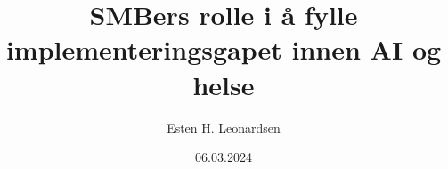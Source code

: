 \documentclass{beamer}
\title{SMBers rolle i å fylle implementeringsgapet innen AI og helse}
\author{Esten H. Leonardsen}
\date{06.03.2024}
\begin{document}
	\begin{frame}
	 	\titlepage
	\end{frame}

    \newcommand{\stickman}[2]{
        \node[circle,fill,minimum size=2.5mm,#2] (head) at #1 {};
        \node[rounded corners=1pt,minimum height=0.65cm,minimum width=0.2cm,fill,below = 0.5pt of head,#2] (body) {};
        \draw[line width=0.5mm,round cap-round cap,#2] ([shift={(1pt,-0.5pt)}]body.north east) --++(-90:3mm);
        \draw[line width=0.5mm,round cap-round cap,#2] ([shift={(-1pt,-0.5pt)}]body.north west)--++(-90:3mm);
        \draw[thick,white,-round cap] (body.south) --++(90:2.75mm);
    }


    \newcommand{\population}{
        \begin{tikzpicture}
            \node [
                double arrow,
                left color=blue,
                right color=red,
                double arrow head extend=0pt,
                transform shape,
                minimum height=1.5cm,
                text width=2.6cm,
                anchor=west
            ] at (-0.5, -1.25){};
            \node[font=\tiny, text=white] at (1.08, -1.25) {Symptomnivå};
            \stickman{(0, 0)}{blue}
            \stickman{(0.5, -0.1)}{blue}
            \stickman{(0.1, 1.1)}{blue}
            \stickman{(0.7, 1.05)}{blue}
            \stickman{(1.15, 0.1)}{blue}
            \stickman{(1.8, 0.2)}{blue!50!red}
            \stickman{(0.4, 2.2)}{blue!80!red}
            \stickman{(1.3, 1.4)}{blue!60!red}
            \stickman{(1.8, 2.2)}{blue!20!red}
            \stickman{(2.3, 1.2)}{blue!10!red}
        \end{tikzpicture}
    }


\end{document}
